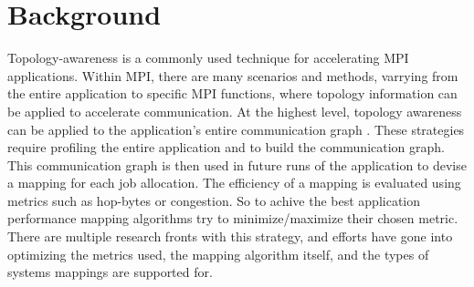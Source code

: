 

\section{Background}
Topology-awareness is a commonly used technique for accelerating MPI applications. 
Within MPI, there are many scenarios and methods, varrying from the entire application to specific MPI functions, where topology information can be applied to accelerate communication.
At the highest level, topology awareness can be applied to the application's entire communication graph \cite{Hoefler2011GenericTopoMappingStrats, Mirsadeghi2016PTRAM, Faraji2016TopoAwareGPUSelection, Mirsadeghi2016MAGC, Galvez2017AutoTopoMap}.
These strategies require profiling the entire application and to build the communication graph.
This communication graph is then used in future runs of the application to devise a mapping for each job allocation.
The efficiency of a mapping is evaluated using metrics such as hop-bytes or congestion.
So to achive the best application performance mapping algorithms try to minimize/maximize their chosen metric.
There are multiple research fronts with this strategy, and efforts have gone into optimizing the metrics used, the mapping algorithm itself, and the types of systems mappings are supported for.

